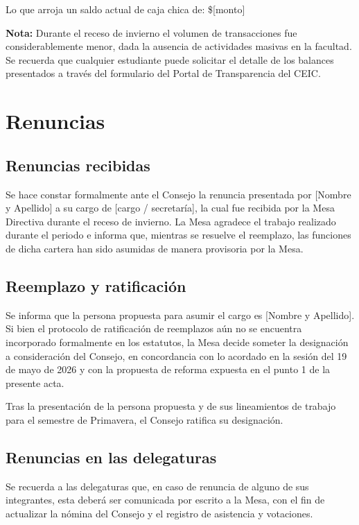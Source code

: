 \documentclass[12pt,letterpaper]{article}
\newif\ifrevision
\newcommand{\dato}[1]{\ifrevision\textcolor[HTML]{C0392B}{#1}\else#1\fi}
\begin{document}
Lo que arroja un saldo actual de caja chica de: \dato{\$[monto]}

\textbf{Nota:} Durante el receso de invierno el volumen de transacciones fue considerablemente menor, dada la ausencia de actividades masivas en la facultad. Se recuerda que cualquier estudiante puede solicitar el detalle de los balances presentados a través del formulario del Portal de Transparencia del CEIC.

\section{Renuncias}

\subsection{Renuncias recibidas}

Se hace constar formalmente ante el Consejo la renuncia presentada por \dato{[Nombre y Apellido]} a su cargo de \dato{[cargo / secretaría]}, la cual fue recibida por la Mesa Directiva durante el receso de invierno. La Mesa agradece el trabajo realizado durante el periodo e informa que, mientras se resuelve el reemplazo, las funciones de dicha cartera han sido asumidas de manera provisoria por la Mesa.

\subsection{Reemplazo y ratificación}

Se informa que la persona propuesta para asumir el cargo es \dato{[Nombre y Apellido]}. Si bien el protocolo de ratificación de reemplazos aún no se encuentra incorporado formalmente en los estatutos, la Mesa decide someter la designación a consideración del Consejo, en concordancia con lo acordado en la sesión del 19 de mayo de 2026 y con la propuesta de reforma expuesta en el punto 1 de la presente acta.

Tras la presentación de la persona propuesta y de sus lineamientos de trabajo para el semestre de Primavera, el Consejo ratifica su designación.

\subsection{Renuncias en las delegaturas}

Se recuerda a las delegaturas que, en caso de renuncia de alguno de sus integrantes, esta deberá ser comunicada por escrito a la Mesa, con el fin de actualizar la nómina del Consejo y el registro de asistencia y votaciones.
\end{document}
